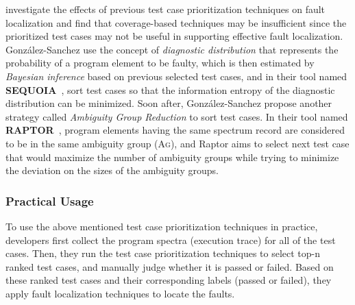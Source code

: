 \citet{JiangCT11} investigate the effects of previous test case prioritization techniques on fault localization and find that coverage-based techniques may be insufficient since the prioritized test cases may not be useful in supporting effective fault localization.
Gonz{\'a}lez-Sanchez \etal use the concept of {\em diagnostic distribution} that represents the probability of a program element to be faulty, which is then estimated by {\em Bayesian inference} based on previous selected test cases, and in their tool named \textbf{S{\scriptsize EQUOIA}}~\citep{Gonzalez-SanchezPAGG11}, sort test cases so that the information entropy of the diagnostic distribution can be minimized.
%
%
%
Soon after, Gonz{\'a}lez-Sanchez \etal propose another strategy
called {\em Ambiguity Group Reduction} to sort test cases.
In their tool named \textbf{R{\scriptsize APTOR}}~\citep{Alberto2011}, program elements having the same spectrum record are considered to be in the same ambiguity group (\textsc{Ag}),
and {\sc Raptor} aims to select next test case that would maximize the number of ambiguity groups while trying to minimize the deviation on the sizes of the ambiguity groups.

\subsubsection{Practical Usage} 

To use the above mentioned test case prioritization techniques in practice, developers first collect the program spectra (execution trace) for all of the test cases. Then, they run the test case prioritization techniques to select top-n ranked test cases, and manually judge whether it is passed or failed. Based on these ranked test cases and their corresponding labels (passed or failed), they apply fault localization techniques\citep[e.g.][]{NainarCRL07,JH05} to locate the faults.

